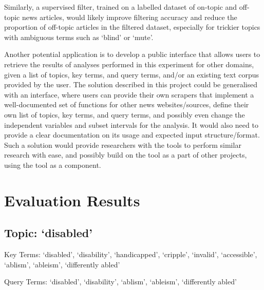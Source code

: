 \documentclass{report}
\begin{document}
Similarly, a supervised filter, trained on a labelled dataset of on-topic and off-topic news articles, would likely improve filtering accuracy and reduce the proportion of off-topic articles in the filtered dataset, especially for trickier topics with ambiguous terms such as `blind' or `mute'.

Another potential application is to develop a public interface that allows users to retrieve the results of analyses performed in this experiment for other domains, given a list of topics, key terms, and query terms, and/or an existing text corpus provided by the user.
The solution described in this project could be generalised with an interface, where users can provide their own scrapers that implement a well-documented set of functions for other news websites/sources, define their own list of topics, key terms, and query terms, and possibly even change the independent variables and subset intervals for the analysis.
It would also need to provide a clear documentation on its usage and expected input structure/format.
Such a solution would provide researchers with the tools to perform similar research with ease, and possibly build on the tool as a part of other projects, using the tool as a component.

\appendix
{}  %

\printbibliography[heading=bibintoc]

\chapter{Evaluation Results}  %

\newpage
\section{Topic: `disabled'}
Key Terms: `disabled', `disability', `handicapped', `cripple', `invalid', `accessible', `ablism', `ableism', `differently abled'

\noindent Query Terms: `disabled', `disability', `ablism', `ableism', `differently abled'
\end{document}
